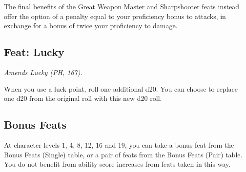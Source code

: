 \documentclass[letterpaper,twocolumn,openany,nodeprecatedcode]{dndbook}
\begin{document}
The final benefits of the Great Weapon Master and Sharpshooter feats instead offer the option of a penalty equal to your proficiency bonus to attacks, in exchange for a bonus of twice your proficiency to damage.

\subsection{Feat: Lucky}
\textit{Amends Lucky (PH, 167).}

When you use a luck point, roll one additional d20. You can choose to replace one d20 from the original roll with this new d20 roll.

\subsection{Bonus Feats}
At character levels 1, 4, 8, 12, 16 and 19, you can take a bonus feat from the Bonus Feats (Single) table, or a pair of feats from the Bonus Feats (Pair) table. You do not benefit from ability score increases from feats taken in this way.
\end{document}
